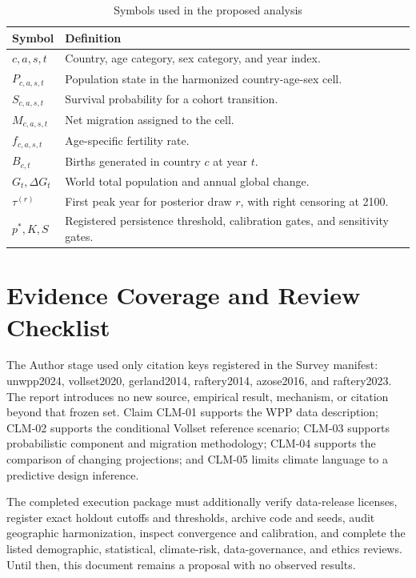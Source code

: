\documentclass[conference]{IEEEtran}
\begin{document}
\begin{table}[t]
\caption{Symbols used in the proposed analysis}
\label{tab:symbols}
\centering
\footnotesize
\begin{tabular}{L{0.24\columnwidth}L{0.66\columnwidth}}
\toprule
Symbol & Definition \\
\midrule
$c,a,s,t$ & Country, age category, sex category, and year index. \\
$P_{c,a,s,t}$ & Population state in the harmonized country-age-sex cell. \\
$S_{c,a,s,t}$ & Survival probability for a cohort transition. \\
$M_{c,a,s,t}$ & Net migration assigned to the cell. \\
$f_{c,a,s,t}$ & Age-specific fertility rate. \\
$B_{c,t}$ & Births generated in country $c$ at year $t$. \\
$G_t,\Delta G_t$ & World total population and annual global change. \\
$\tau^{(r)}$ & First peak year for posterior draw $r$, with right censoring at 2100. \\
$p^*,K,S$ & Registered persistence threshold, calibration gates, and sensitivity gates. \\
\bottomrule
\end{tabular}
\end{table}

\section{Evidence Coverage and Review Checklist}

The Author stage used only citation keys registered in the Survey manifest: unwpp2024, vollset2020, gerland2014, raftery2014, azose2016, and raftery2023. The report introduces no new source, empirical result, mechanism, or citation beyond that frozen set. Claim CLM-01 supports the WPP data description; CLM-02 supports the conditional Vollset reference scenario; CLM-03 supports probabilistic component and migration methodology; CLM-04 supports the comparison of changing projections; and CLM-05 limits climate language to a predictive design inference.

The completed execution package must additionally verify data-release licenses, register exact holdout cutoffs and thresholds, archive code and seeds, audit geographic harmonization, inspect convergence and calibration, and complete the listed demographic, statistical, climate-risk, data-governance, and ethics reviews. Until then, this document remains a proposal with no observed results.
\end{document}
